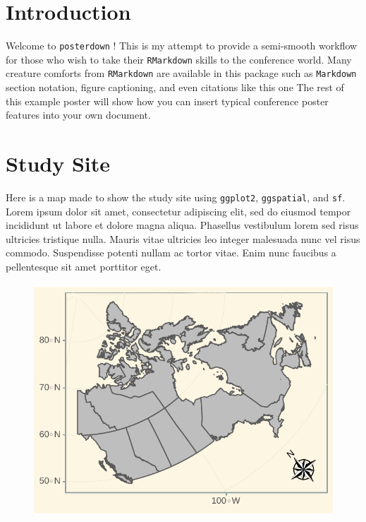 \documentclass[article,30pt,extrafontsizes]{memoir}
\begin{document}
\begin{adjmulticols*}{3}{10mm}{10mm}
\normalsize{
\color{black}
\section{Introduction}\label{introduction}

Welcome to \texttt{posterdown} ! This is my attempt to provide a
semi-smooth workflow for those who wish to take their \texttt{RMarkdown}
skills to the conference world. Many creature comforts from
\texttt{RMarkdown} are available in this package such as
\texttt{Markdown} section notation, figure captioning, and even
citations like this one \autocite{holden_identifying_2012} The rest of
this example poster will show how you can insert typical conference
poster features into your own document.

\section{Study Site}\label{study-site}

Here is a map made to show the study site using \texttt{ggplot2},
\texttt{ggspatial}, and \texttt{sf}. Lorem ipsum dolor sit amet,
\autocite{middleton_geological_nodate} consectetur adipiscing elit, sed
do eiusmod tempor incididunt ut labore et dolore magna aliqua. Phasellus
vestibulum lorem sed risus ultricies tristique nulla. Mauris vitae
ultricies leo integer malesuada nunc vel risus commodo. Suspendisse
potenti nullam ac tortor vitae. Enim nunc faucibus a pellentesque sit
amet porttitor eget. \vspace{15mm}

\begin{figure}

{\centering \includegraphics[width=0.8\linewidth]{skeleton_files/figure-latex/unnamed-chunk-2-1} 

}
\end{figure}}
\end{adjmulticols*}
\end{document}
